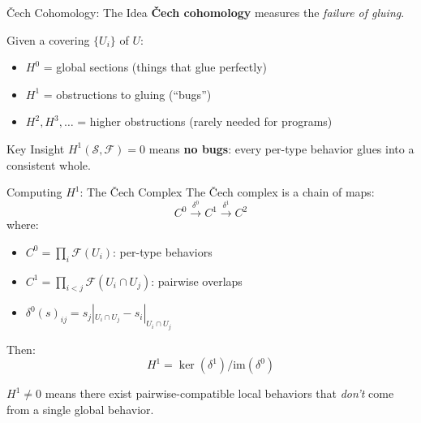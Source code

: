 \documentclass[aspectratio=169,11pt]{beamer}
\newcommand{\site}{\mathcal{S}}
\begin{document}
\begin{frame}{\v{C}ech Cohomology: The Idea}
\textbf{\v{C}ech cohomology} measures the \emph{failure of gluing}.

\vspace{0.5em}
Given a covering $\{U_i\}$ of $U$:
\begin{itemize}
\item $H^0$ = global sections (things that glue perfectly)
\item $H^1$ = obstructions to gluing (``bugs'')
\item $H^2, H^3, \ldots$ = higher obstructions (rarely needed for programs)
\end{itemize}

\vspace{0.5em}
\begin{block}{Key Insight}
$H^1(\site, \mathcal{F}) = 0$ means \textbf{no bugs}: every per-type behavior glues into a consistent whole.
\end{block}
\end{frame}

\begin{frame}{Computing $H^1$: The \v{C}ech Complex}
The \v{C}ech complex is a chain of maps:
\[
C^0 \xrightarrow{\delta^0} C^1 \xrightarrow{\delta^1} C^2
\]
where:
\begin{itemize}
\item $C^0 = \prod_i \mathcal{F}(U_i)$: per-type behaviors
\item $C^1 = \prod_{i<j} \mathcal{F}(U_i \cap U_j)$: pairwise overlaps
\item $\delta^0(s)_{ij} = s_j|_{U_i \cap U_j} - s_i|_{U_i \cap U_j}$
\end{itemize}

\vspace{0.5em}
Then:
\[
H^1 = \ker(\delta^1) / \mathrm{im}(\delta^0)
\]

\vspace{0.5em}
$H^1 \neq 0$ means there exist pairwise-compatible local behaviors that \emph{don't} come from a single global behavior.
\end{frame}
\end{document}
